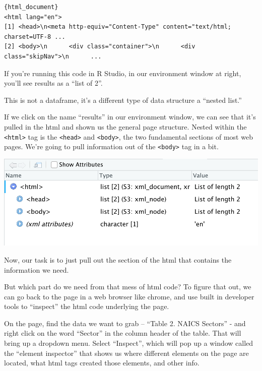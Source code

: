 \documentclass[
  letterpaper,
  DIV=11,
  numbers=noendperiod]{scrreprt}
\begin{document}
\begin{verbatim}
{html_document}
<html lang="en">
[1] <head>\n<meta http-equiv="Content-Type" content="text/html; charset=UTF-8 ...
[2] <body>\n      <div class="container">\n      <div class="skipNav">\n      ...
\end{verbatim}

If you're running this code in R Studio, in our environment window at
right, you'll see results as a ``list of 2''.

This is not a dataframe, it's a different type of data structure a
``nested list.''

If we click on the name ``results'' in our environment window, we can
see that it's pulled in the html and shown us the general page
structure. Nested within the \texttt{\textless{}html\textgreater{}} tag
is the \texttt{\textless{}head\textgreater{}} and
\texttt{\textless{}body\textgreater{}}, the two fundamental sections of
most web pages. We're going to pull information out of the
\texttt{\textless{}body\textgreater{}} tag in a bit.

\includegraphics{./images/rvest3.png}

Now, our task is to just pull out the section of the html that contains
the information we need.

But which part do we need from that mess of html code? To figure that
out, we can go back to the page in a web browser like chrome, and use
built in developer tools to ``inspect'' the html code underlying the
page.

On the page, find the data we want to grab -- ``Table 2. NAICS Sectors''
- and right click on the word ``Sector'' in the column header of the
table. That will bring up a dropdown menu. Select ``Inspect'', which
will pop up a window called the ``element inspector'' that shows us
where different elements on the page are located, what html tags created
those elements, and other info.
\end{document}
